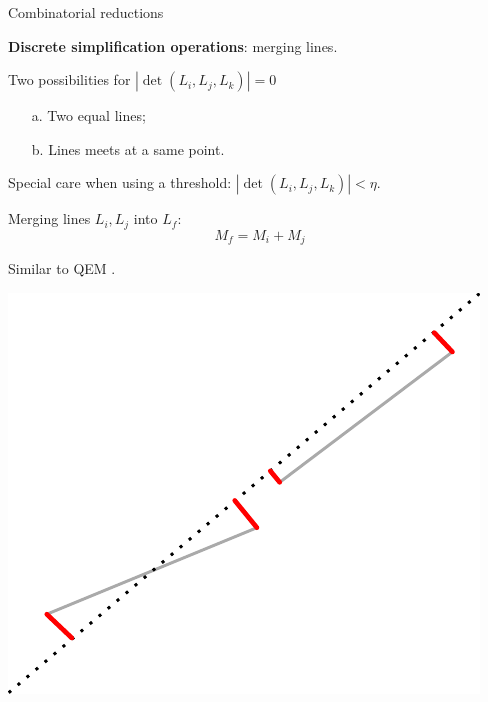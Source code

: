 \begin{frame}{Combinatorial reductions}
	\scriptsize

	\textbf{Discrete simplification operations}: merging lines.
		
	Two possibilities for $|\det(L_i, L_j, L_k) | = 0$
	\begin{enumerate}
		\item[a.] Two equal lines;
		\item[b.] Lines meets at a same point.
	\end{enumerate}
	
	Special care when using a threshold: $|\det(L_i, L_j, L_k) | < \eta$.
	\pause
	
	\begin{minipage}{0.7\linewidth}
	Merging lines $L_i, L_j$ into $L_f$:
	\[ M_f = M_i + M_j \]
	
	Similar to QEM \cite{garland_SurfaceSimplificationUsing_1997}.
	\end{minipage}%
	\begin{minipage}{0.3\linewidth}
		\centering
		\includegraphics[height=0.6\linewidth]{metric_merge}
	\end{minipage}
\end{frame}

